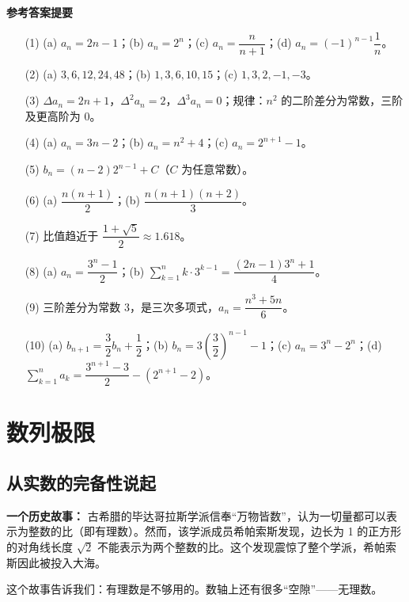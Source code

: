 \documentclass{ctexart}
\newenvironment{custom}[1]{\par\noindent \textbf{#1}\quad}{\par\vspace{1em}}
\begin{document}
\newpage 

\begin{custom}{参考答案提要}

\begin{enumerate}
\item[(1)] (a) \(a_n = 2n-1\)；(b) \(a_n = 2^n\)；(c) \(a_n = \dfrac{n}{n+1}\)；(d) \(a_n = (-1)^{n-1} \dfrac{1}{n}\)。
\item[(2)] (a) \(3, 6, 12, 24, 48\)；(b) \(1, 3, 6, 10, 15\)；(c) \(1, 3, 2, -1, -3\)。
\item[(3)] \(\Delta a_n = 2n+1\)，\(\Delta^2 a_n = 2\)，\(\Delta^3 a_n = 0\)；规律：\(n^2\) 的二阶差分为常数，三阶及更高阶为 0。
\item[(4)] (a) \(a_n = 3n-2\)；(b) \(a_n = n^2 + 4\)；(c) \(a_n = 2^{n+1} - 1\)。
\item[(5)] \(b_n = (n-2)2^{n-1} + C\)（\(C\) 为任意常数）。
\item[(6)] (a) \(\dfrac{n(n+1)}{2}\)；(b) \(\dfrac{n(n+1)(n+2)}{3}\)。
\item[(7)] 比值趋近于 \(\dfrac{1+\sqrt{5}}{2} \approx 1.618\)。
\item[(8)] (a) \(a_n = \dfrac{3^n - 1}{2}\)；(b) \(\sum_{k=1}^{n} k \cdot 3^{k-1} = \dfrac{(2n-1)3^n + 1}{4}\)。
\item[(9)] 三阶差分为常数 3，是三次多项式，\(a_n = \dfrac{n^3 + 5n}{6}\)。
\item[(10)] (a) \(b_{n+1} = \dfrac{3}{2} b_n + \dfrac{1}{2}\)；(b) \(b_n = 3\left(\dfrac{3}{2}\right)^{n-1} - 1\)；(c) \(a_n = 3^n - 2^n\)；(d) \(\sum_{k=1}^{n} a_k = \dfrac{3^{n+1} - 3}{2} - (2^{n+1} - 2)\)。
\end{enumerate}
\end{custom}

\clearpage
\section{数列极限}

\subsection{从实数的完备性说起}

\textbf{一个历史故事：} 古希腊的毕达哥拉斯学派信奉“万物皆数”，认为一切量都可以表示为整数的比（即有理数）。然而，该学派成员希帕索斯发现，边长为 1 的正方形的对角线长度 \(\sqrt{2}\) 不能表示为两个整数的比。这个发现震惊了整个学派，希帕索斯因此被投入大海。

这个故事告诉我们：有理数是不够用的。数轴上还有很多“空隙”——无理数。
\end{document}
